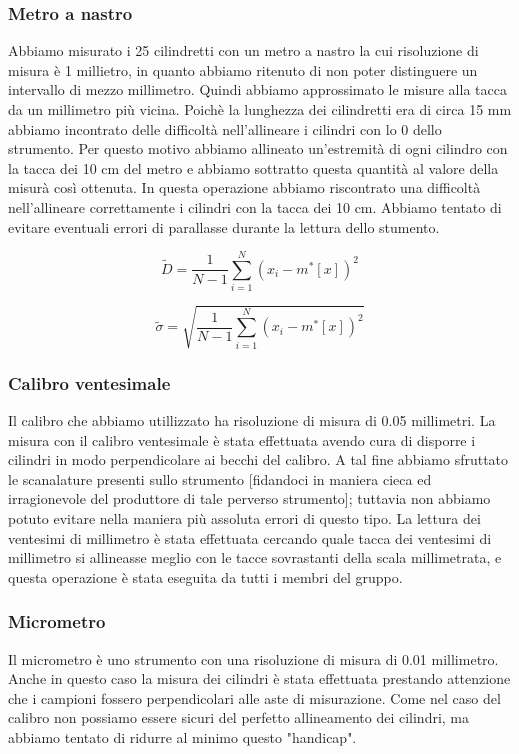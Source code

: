 \documentclass[12pt, twoside, a4paper]{article}
\begin{document}
\subsubsection{Metro a nastro}
Abbiamo misurato i 25 cilindretti con un metro a nastro la cui risoluzione di misura è 1 millietro, in quanto abbiamo ritenuto di non poter distinguere un intervallo di mezzo millimetro. Quindi abbiamo approssimato le misure alla tacca da un millimetro più vicina. Poichè la lunghezza dei cilindretti era di circa 15 mm abbiamo incontrato delle difficoltà nell'allineare i cilindri con lo 0 dello strumento. Per questo motivo abbiamo allineato un'estremità di ogni cilindro con la tacca dei 10 cm del metro e abbiamo sottratto questa quantità al valore della misurà così ottenuta. In questa operazione abbiamo riscontrato una difficoltà nell'allineare correttamente i cilindri con la tacca dei 10 cm. Abbiamo tentato di evitare eventuali errori di parallasse durante la lettura dello stumento. 

\begin{equation}
\tilde{D} = \frac{1}{N - 1} \sum_{i=1}^{N} (x_i - m^*[x])^2
\end{equation}

\begin{equation}
\tilde{\sigma} = \sqrt{\frac{1}{N - 1} \sum_{i=1}^{N} (x_i - m^*[x])^2}
\end{equation}

\subsubsection{Calibro ventesimale}
Il calibro che abbiamo utillizzato ha risoluzione di misura di 0.05 millimetri. La misura con il calibro ventesimale è stata effettuata avendo cura di disporre i cilindri in modo perpendicolare ai becchi del calibro. A tal fine abbiamo sfruttato le scanalature presenti sullo strumento [fidandoci in maniera cieca ed irragionevole del produttore di tale perverso strumento]; tuttavia non abbiamo potuto evitare nella maniera più assoluta errori di questo tipo.
La lettura dei ventesimi di millimetro è stata effettuata cercando quale tacca dei ventesimi di millimetro si allineasse meglio con le tacce sovrastanti della scala millimetrata, e questa operazione è stata eseguita da tutti i membri del gruppo.

\subsubsection{Micrometro}
Il micrometro è uno strumento con una risoluzione di misura di 0.01 millimetro. Anche in questo caso la misura dei cilindri è stata effettuata prestando attenzione che i campioni fossero perpendicolari alle aste di misurazione. Come nel caso del calibro non possiamo essere sicuri del perfetto allineamento dei cilindri, ma abbiamo tentato di ridurre al minimo questo "handicap".
\end{document}
